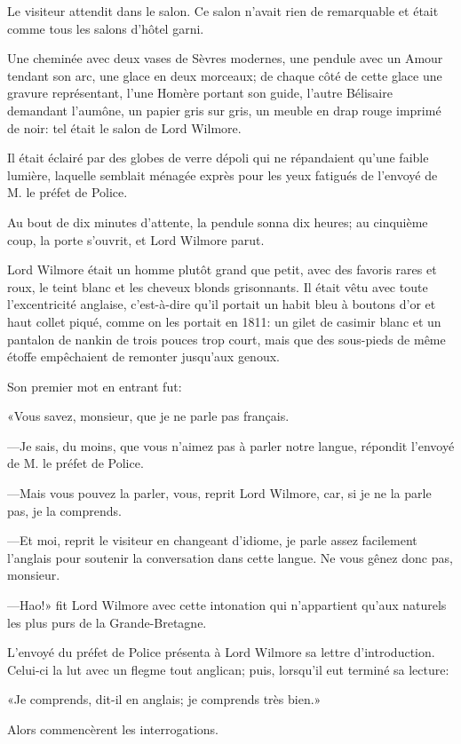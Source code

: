 Le visiteur attendit dans le salon. Ce salon n'avait rien de remarquable et était comme tous les salons d'hôtel garni. 

Une cheminée avec deux vases de Sèvres modernes, une pendule avec un Amour tendant son arc, une glace en deux morceaux; de chaque côté de cette glace une gravure représentant, l'une Homère portant son guide, l'autre Bélisaire demandant l'aumône, un papier gris sur gris, un meuble en drap rouge imprimé de noir: tel était le salon de Lord Wilmore. 

Il était éclairé par des globes de verre dépoli qui ne répandaient qu'une faible lumière, laquelle semblait ménagée exprès pour les yeux fatigués de l'envoyé de M. le préfet de Police. 

Au bout de dix minutes d'attente, la pendule sonna dix heures; au cinquième coup, la porte s'ouvrit, et Lord Wilmore parut. 

Lord Wilmore était un homme plutôt grand que petit, avec des favoris rares et roux, le teint blanc et les cheveux blonds grisonnants. Il était vêtu avec toute l'excentricité anglaise, c'est-à-dire qu'il portait un habit bleu à boutons d'or et haut collet piqué, comme on les portait en 1811: un gilet de casimir blanc et un pantalon de nankin de trois pouces trop court, mais que des sous-pieds de même étoffe empêchaient de remonter jusqu'aux genoux. 

Son premier mot en entrant fut: 

«Vous savez, monsieur, que je ne parle pas français. 

—Je sais, du moins, que vous n'aimez pas à parler notre langue, répondit l'envoyé de M. le préfet de Police. 

—Mais vous pouvez la parler, vous, reprit Lord Wilmore, car, si je ne la parle pas, je la comprends. 

—Et moi, reprit le visiteur en changeant d'idiome, je parle assez facilement l'anglais pour soutenir la conversation dans cette langue. Ne vous gênez donc pas, monsieur. 

—Hao!» fit Lord Wilmore avec cette intonation qui n'appartient qu'aux naturels les plus purs de la Grande-Bretagne. 

L'envoyé du préfet de Police présenta à Lord Wilmore sa lettre d'introduction. Celui-ci la lut avec un flegme tout anglican; puis, lorsqu'il eut terminé sa lecture: 

«Je comprends, dit-il en anglais; je comprends très bien.» 

Alors commencèrent les interrogations. 

